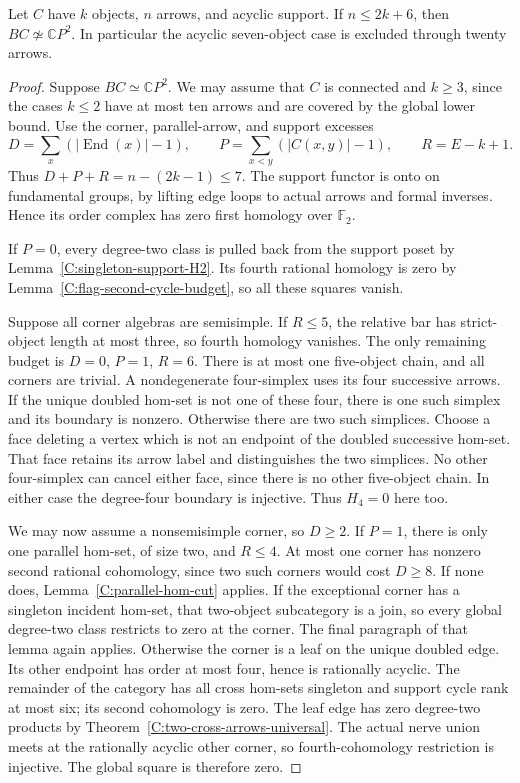\begin{theorem}\label{C:acyclic-arrow-excess-seven}
Let $C$ have $k$ objects, $n$ arrows, and acyclic support.
If $n\leq2k+6$, then $BC\not\simeq\mathbb CP^2$.
In particular the acyclic seven-object case is excluded
through twenty arrows.
\end{theorem}
\begin{proof}
Suppose $BC\simeq\mathbb CP^2$.  We may assume that $C$ is
connected and $k\geq3$, since the cases $k\leq2$ have at
most ten arrows and are covered by the global lower bound.
Use the corner, parallel-arrow, and support excesses
\[
 D=\sum_x(|\operatorname{End}(x)|-1),\qquad
 P=\sum_{x<y}(|C(x,y)|-1),\qquad R=E-k+1.
\]
Thus $D+P+R=n-(2k-1)\leq7$.
The support functor is onto on fundamental groups, by lifting
edge loops to actual arrows and formal inverses.  Hence its
order complex has zero first homology over $\mathbb F_2$.

If $P=0$, every degree-two class is pulled back from the
support poset by Lemma~\ref{C:singleton-support-H2}.
Its fourth rational homology is zero by
Lemma~\ref{C:flag-second-cycle-budget}, so all these squares
vanish.

Suppose all corner algebras are semisimple.  If $R\leq5$,
the relative bar has strict-object length at most three,
so fourth homology vanishes.  The only remaining budget is
$D=0$, $P=1$, $R=6$.  There is at most one five-object
chain, and all corners are trivial.  A nondegenerate
four-simplex uses its four successive arrows.  If the unique
doubled hom-set is not one of these four, there is one such
simplex and its boundary is nonzero.  Otherwise there are
two such simplices.  Choose a face deleting a vertex which
is not an endpoint of the doubled successive hom-set.
That face retains its arrow label and distinguishes the two
simplices.  No other four-simplex can cancel either face,
since there is no other five-object chain.  In either case
the degree-four boundary is injective.  Thus $H_4=0$ here too.

We may now assume a nonsemisimple corner, so $D\geq2$.
If $P=1$, there is only one parallel hom-set, of size two,
and $R\leq4$.  At most one corner has nonzero second
rational cohomology, since two such corners would cost
$D\geq8$.  If none does, Lemma~\ref{C:parallel-hom-cut}
applies.  If the exceptional corner has a singleton incident
hom-set, that two-object subcategory is a join, so every
global degree-two class restricts to zero at the corner.
The final paragraph of that lemma again applies.
Otherwise the corner is a leaf on the unique doubled edge.
Its other endpoint has order at most four, hence is
rationally acyclic.  The remainder of the category has all
cross hom-sets singleton and support cycle rank at most six;
its second cohomology is zero.  The leaf edge has zero
degree-two products by
Theorem~\ref{C:two-cross-arrows-universal}.  The actual
nerve union meets at the rationally acyclic other corner,
so fourth-cohomology restriction is injective.  The global
square is therefore zero.


\end{proof}
